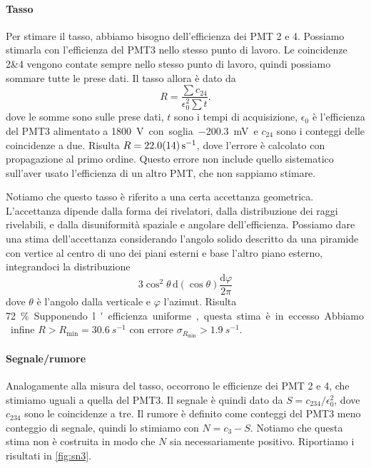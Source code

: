 \documentclass[a4paper]{article}
\newcommand*\de{\mathrm{d}}
\begin{document}
\paragraph{Tasso}

Per stimare il tasso, abbiamo bisogno dell'efficienza dei PMT 2 e 4.
Possiamo stimarla con l'efficienza del PMT3 nello stesso punto di lavoro.
Le coincidenze 2\&4 vengono contate sempre nello stesso punto di lavoro,
quindi possiamo sommare tutte le prese dati.
Il tasso allora è dato da
\begin{equation*}
	R = \frac{\sum c_{24}}{\epsilon_0^2 \sum t}.
\end{equation*}
dove le somme sono sulle prese dati,
$t$ sono i tempi di acquisizione,
$\epsilon_0$ è l'efficienza del PMT3 alimentato a \SI{1800}V con soglia \SI{-200.3}{mV}
e $c_{24}$ sono i conteggi delle coincidenze a due.
Risulta $R=\SI{22.0 \pm 1.4}{s^{-1}}$,
dove l'errore è calcolato con propagazione al primo ordine.
Questo errore non include quello sistematico sull'aver usato l'efficienza di un altro PMT,
che non sappiamo stimare.

Notiamo che questo tasso è riferito a una certa accettanza geometrica.
L'accettanza dipende dalla forma dei rivelatori,
dalla distribuzione dei raggi rivelabili,
e dalla disuniformità spaziale e angolare dell'efficienza.
Possiamo dare una stima dell'accettanza considerando l'angolo solido
descritto da una piramide con vertice al centro di uno dei piani esterni e base l'altro piano esterno,
integrandoci la distribuzione
\[3\cos^2\theta\,\de(\cos\theta)\frac{\de\varphi}{2\pi}\]
dove $\theta$ è l'angolo dalla verticale e $\varphi$ l'azimut.
Risulta \SI{72}\%.
Supponendo l'efficienza uniforme,
questa stima è in eccesso.
Abbiamo infine
$R > R_\text{min} = \SI{30.6}{s^{-1}}$ con errore $\sigma_{R_\text{min}}>\SI{1.9}{s^{-1}}$.

\paragraph{Segnale/rumore}

Analogamente alla misura del tasso,
occorrono le efficienze dei PMT 2 e 4,
che stimiamo uguali a quella del PMT3.
Il segnale è quindi dato da
$S=c_{234}/\epsilon_0^2$,
dove $c_{234}$ sono le coincidenze a tre.
Il rumore è definito come conteggi del PMT3 meno conteggio di segnale,
quindi lo stimiamo con $N=c_3-S$.
Notiamo che questa stima non è costruita in modo che $N$ sia necessariamente positivo.
Riportiamo i risultati in \autoref{fig:sn3}.
\end{document}
